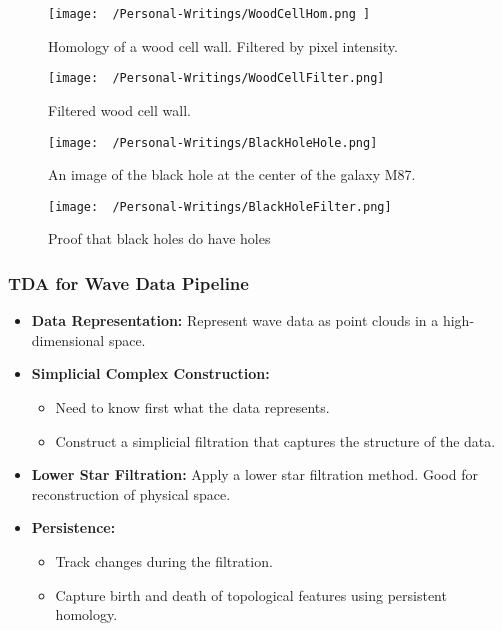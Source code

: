 \documentclass{beamer}
\begin{document}
\begin{frame}
  \begin{figure}
    \centering
    \texttt{[image: ~/Personal-Writings/WoodCellHom.png ]}
    \caption{Homology of a wood cell wall. Filtered by pixel intensity.}
  \end{figure}
\end{frame}

\begin{frame}
  \begin{figure}
    \centering
    \texttt{[image: ~/Personal-Writings/WoodCellFilter.png]}
    \caption{Filtered wood cell wall.}
  \end{figure}
\end{frame}

\begin{frame}
  \begin{figure}
    \centering
    \texttt{[image: ~/Personal-Writings/BlackHoleHole.png]}
    \caption{An image of the black hole at the center of the galaxy M87.}
  \end{figure}
\end{frame}

\begin{frame}
  \begin{figure}
    \centering
    \texttt{[image: ~/Personal-Writings/BlackHoleFilter.png]}
    \caption{Proof that black holes do have holes}
  \end{figure}
\end{frame}

\begin{frame}
  \frametitle{TDA for Wave Data Pipeline}

  \begin{itemize}
    \setlength\itemsep{1em} %
    \item \textbf{Data Representation:} Represent wave data as point clouds in a high-dimensional space.
    \item \textbf{Simplicial Complex Construction:}
      \begin{itemize}
        \setlength\itemsep{0.5em} %
        \item Need to know first what the data represents.
        \item Construct a simplicial filtration that captures the structure of the data.
      \end{itemize}
    \item \textbf{Lower Star Filtration:} Apply a lower star filtration method. Good for reconstruction of physical space.
    \item \textbf{Persistence:}
      \begin{itemize}
        \setlength\itemsep{0.5em} %
        \item Track changes during the filtration.
        \item Capture birth and death of topological features using persistent homology.
      \end{itemize}
  \end{itemize}
\end{frame}
\end{document}
